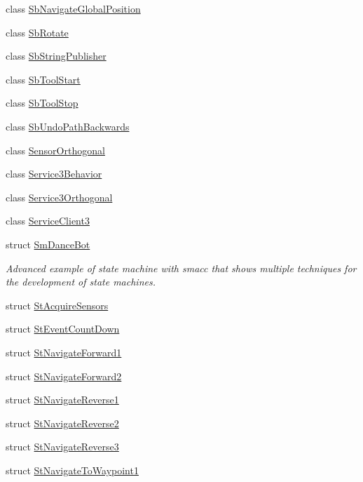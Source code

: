 \begin{DoxyCompactItemize}
class \hyperlink{classsm__dance__bot_1_1SbNavigateGlobalPosition}{Sb\+Navigate\+Global\+Position}
\item 
class \hyperlink{classsm__dance__bot_1_1SbRotate}{Sb\+Rotate}
\item 
class \hyperlink{classsm__dance__bot_1_1SbStringPublisher}{Sb\+String\+Publisher}
\item 
class \hyperlink{classsm__dance__bot_1_1SbToolStart}{Sb\+Tool\+Start}
\item 
class \hyperlink{classsm__dance__bot_1_1SbToolStop}{Sb\+Tool\+Stop}
\item 
class \hyperlink{classsm__dance__bot_1_1SbUndoPathBackwards}{Sb\+Undo\+Path\+Backwards}
\item 
class \hyperlink{classsm__dance__bot_1_1SensorOrthogonal}{Sensor\+Orthogonal}
\item 
class \hyperlink{classsm__dance__bot_1_1Service3Behavior}{Service3\+Behavior}
\item 
class \hyperlink{classsm__dance__bot_1_1Service3Orthogonal}{Service3\+Orthogonal}
\item 
class \hyperlink{classsm__dance__bot_1_1ServiceClient3}{Service\+Client3}
\item 
struct \hyperlink{structsm__dance__bot_1_1SmDanceBot}{Sm\+Dance\+Bot}
\begin{DoxyCompactList}\small\item\em Advanced example of state machine with smacc that shows multiple techniques for the development of state machines. \end{DoxyCompactList}\item 
struct \hyperlink{structsm__dance__bot_1_1StAcquireSensors}{St\+Acquire\+Sensors}
\item 
struct \hyperlink{structsm__dance__bot_1_1StEventCountDown}{St\+Event\+Count\+Down}
\item 
struct \hyperlink{structsm__dance__bot_1_1StNavigateForward1}{St\+Navigate\+Forward1}
\item 
struct \hyperlink{structsm__dance__bot_1_1StNavigateForward2}{St\+Navigate\+Forward2}
\item 
struct \hyperlink{structsm__dance__bot_1_1StNavigateReverse1}{St\+Navigate\+Reverse1}
\item 
struct \hyperlink{structsm__dance__bot_1_1StNavigateReverse2}{St\+Navigate\+Reverse2}
\item 
struct \hyperlink{structsm__dance__bot_1_1StNavigateReverse3}{St\+Navigate\+Reverse3}
\item 
struct \hyperlink{structsm__dance__bot_1_1StNavigateToWaypoint1}{St\+Navigate\+To\+Waypoint1}

\end{DoxyCompactItemize}
